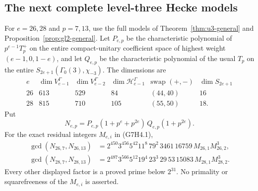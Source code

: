 \subsection{The next complete level-three Hecke models}
\label{sec:u3-higher4}

\begin{proposition}
\label{prop:hecke-higher4}
For \(e=26,28\) and \(p=7,13\), use the full models of
Theorem~\ref{thm:u3-general} and Proposition~\ref{prop:gl2-general}.
Let \(P_{e,p}\) be the characteristic polynomial of
\(p^{e-1}T_p^+\) on the entire compact-unitary coefficient space
of highest weight \((e-1,0,1-e)\), and let \(Q_{e,p}\) be the
characteristic polynomial of the usual \(T_p\) on the entire
\(S_{2e+1}(\Gamma_0(3),\chi_{-3})\). The dimensions are
\[
\begin{array}{c|r|r|r|c|r}
e&\dim V_{e-1}^{\Gamma}&\dim V_{e-2}^{\Gamma}&
\dim\mathcal H_{e-1}^{\Gamma}&\text{swap }(+,-)&\dim S_{2e+1}\\\hline
26&613&529&84&(44,40)&16\\
28&815&710&105&(55,50)&18.
\end{array}
\tag{HH4.1}
\]
Put
\[
 N_{e,p}=P_{e,p}(1+p^e+p^{2e})\,Q_{e,p}(1+p^{2e}).
 \tag{HH4.2}
\]
For the exact residual integers \(M_{e,i}\) in (G7H4.1),
\[
\begin{aligned}
\gcd(N_{26,7},N_{26,13})
 &=2^{450}3^{456}5^{42}11^8\,79^2\,3461\,16759\,
       M_{26,1}M_{26,2}^3,\\
\gcd(N_{28,7},N_{28,13})
 &=2^{487}3^{566}5^{12}19^4\,23^3\,29\,53\,15083\,
       M_{28,1}M_{28,2}^3.
\end{aligned}
\tag{HH4.3}
\]
Every other displayed factor is a proved prime below \(2^{31}\).
No primality or squarefreeness of the \(M_{e,i}\) is asserted.
\end{proposition}

